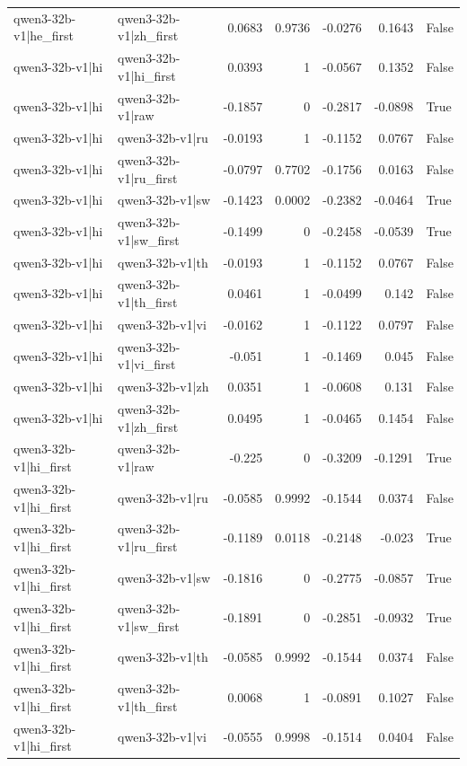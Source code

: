 \begin{table}
\begin{tabular}{l l r r r r l}
qwen3-32b-v1|he_first & qwen3-32b-v1|zh_first & 0.0683 & 0.9736 & -0.0276 & 0.1643 & False \\
qwen3-32b-v1|hi & qwen3-32b-v1|hi_first & 0.0393 & 1 & -0.0567 & 0.1352 & False \\
qwen3-32b-v1|hi & qwen3-32b-v1|raw & -0.1857 & 0 & -0.2817 & -0.0898 & True \\
qwen3-32b-v1|hi & qwen3-32b-v1|ru & -0.0193 & 1 & -0.1152 & 0.0767 & False \\
qwen3-32b-v1|hi & qwen3-32b-v1|ru_first & -0.0797 & 0.7702 & -0.1756 & 0.0163 & False \\
qwen3-32b-v1|hi & qwen3-32b-v1|sw & -0.1423 & 0.0002 & -0.2382 & -0.0464 & True \\
qwen3-32b-v1|hi & qwen3-32b-v1|sw_first & -0.1499 & 0 & -0.2458 & -0.0539 & True \\
qwen3-32b-v1|hi & qwen3-32b-v1|th & -0.0193 & 1 & -0.1152 & 0.0767 & False \\
qwen3-32b-v1|hi & qwen3-32b-v1|th_first & 0.0461 & 1 & -0.0499 & 0.142 & False \\
qwen3-32b-v1|hi & qwen3-32b-v1|vi & -0.0162 & 1 & -0.1122 & 0.0797 & False \\
qwen3-32b-v1|hi & qwen3-32b-v1|vi_first & -0.051 & 1 & -0.1469 & 0.045 & False \\
qwen3-32b-v1|hi & qwen3-32b-v1|zh & 0.0351 & 1 & -0.0608 & 0.131 & False \\
qwen3-32b-v1|hi & qwen3-32b-v1|zh_first & 0.0495 & 1 & -0.0465 & 0.1454 & False \\
qwen3-32b-v1|hi_first & qwen3-32b-v1|raw & -0.225 & 0 & -0.3209 & -0.1291 & True \\
qwen3-32b-v1|hi_first & qwen3-32b-v1|ru & -0.0585 & 0.9992 & -0.1544 & 0.0374 & False \\
qwen3-32b-v1|hi_first & qwen3-32b-v1|ru_first & -0.1189 & 0.0118 & -0.2148 & -0.023 & True \\
qwen3-32b-v1|hi_first & qwen3-32b-v1|sw & -0.1816 & 0 & -0.2775 & -0.0857 & True \\
qwen3-32b-v1|hi_first & qwen3-32b-v1|sw_first & -0.1891 & 0 & -0.2851 & -0.0932 & True \\
qwen3-32b-v1|hi_first & qwen3-32b-v1|th & -0.0585 & 0.9992 & -0.1544 & 0.0374 & False \\
qwen3-32b-v1|hi_first & qwen3-32b-v1|th_first & 0.0068 & 1 & -0.0891 & 0.1027 & False \\
qwen3-32b-v1|hi_first & qwen3-32b-v1|vi & -0.0555 & 0.9998 & -0.1514 & 0.0404 & False \\

\end{tabular}
\end{table}
